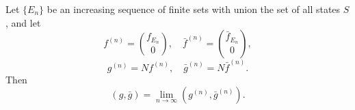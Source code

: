 Let $\{E_n\}$ be an increasing sequence of finite sets with union the set of all states $S$, and let
$$f^{(n)} = \binom{f_{E_n}}{0}, \quad \bar{f}^{(n)} = \binom{\bar{f}_{E_n}}{0},$$
$$g^{(n)} = Nf^{(n)}, \quad \bar{g}^{(n)} = N\bar{f}^{(n)}.$$
Then
$$(g, \bar{g}) = \lim_{n \to \infty} (g^{(n)}, \bar{g}^{(n)}).$$
